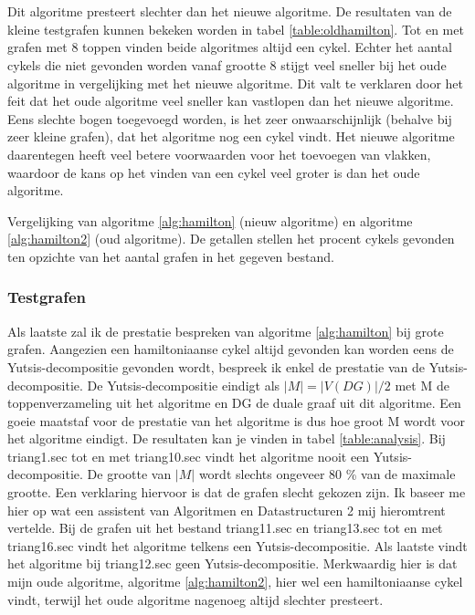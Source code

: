 \documentclass[11pt, a4paper, table]{article}
\theoremstyle{definition}
\theoremstyle{definition}
\theoremstyle{definition}
\begin{document}
\\\\Dit algoritme presteert slechter dan het nieuwe algoritme. De resultaten van de kleine testgrafen kunnen bekeken worden in tabel \ref{table:oldhamilton}. Tot en met grafen met 8 toppen vinden beide algoritmes altijd een cykel. Echter het aantal cykels die niet gevonden worden vanaf grootte 8 stijgt veel sneller bij het oude algoritme in vergelijking met het nieuwe algoritme. Dit valt te verklaren door het feit dat het oude algoritme veel sneller kan vastlopen dan het nieuwe algoritme. Eens slechte bogen toegevoegd worden, is het zeer onwaarschijnlijk (behalve bij zeer kleine grafen), dat het algoritme nog een cykel vindt. Het nieuwe algoritme daarentegen heeft veel betere voorwaarden voor het toevoegen van vlakken, waardoor de kans op het vinden van een cykel veel groter is dan het oude algoritme. 
\newline
\begin{table}
	\center
	\caption{Vergelijking van algoritme \ref{alg:hamilton} (nieuw algoritme) en algoritme \ref{alg:hamilton2}  (oud algoritme). De getallen stellen het procent cykels gevonden ten opzichte van het aantal grafen in het gegeven bestand.
	\label{table:oldhamilton}
	} 
\end{table}
\subsubsection{Testgrafen}
Als laatste zal ik de prestatie bespreken van algoritme \ref{alg:hamilton} bij grote grafen. Aangezien een hamiltoniaanse cykel altijd gevonden kan worden eens de Yutsis-decompositie gevonden wordt, bespreek ik enkel de prestatie van de Yutsis-decompositie. De Yutsis-decompositie eindigt als $|M| = |V(DG)|/2$ met M de toppenverzameling uit het algoritme en DG de duale graaf uit dit algoritme. Een goeie maatstaf voor de prestatie van het algoritme is dus hoe groot M wordt voor het algoritme eindigt. De resultaten kan je vinden in tabel \ref{table:analysis}. Bij triang1.sec tot en met triang10.sec vindt het algoritme nooit een Yutsis-decompositie. De grootte van $|M|$ wordt slechts ongeveer 80 \% van de maximale grootte. Een verklaring hiervoor is dat de grafen slecht gekozen zijn. Ik baseer me hier op wat een assistent van Algoritmen en Datastructuren 2 mij hieromtrent vertelde. Bij de grafen uit het bestand triang11.sec en triang13.sec tot en met triang16.sec vindt het algoritme telkens een Yutsis-decompositie. Als laatste vindt het algoritme bij triang12.sec geen Yutsis-decompositie. Merkwaardig hier is dat mijn oude algoritme, algoritme \ref{alg:hamilton2}, hier wel een hamiltoniaanse cykel vindt, terwijl het oude algoritme nagenoeg altijd slechter presteert. 
\end{document}
